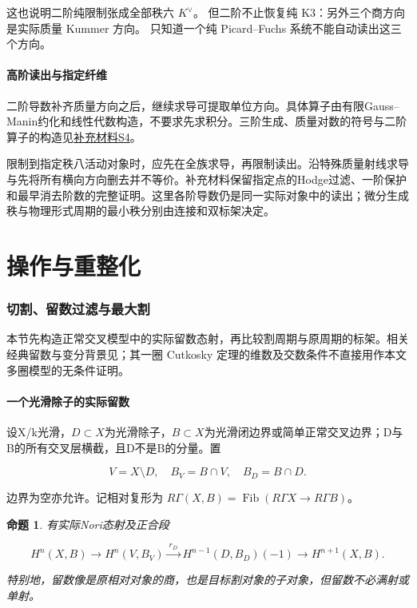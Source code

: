 \documentclass[11pt,a4paper,oneside]{ctexart}
\theoremstyle{cnplain}
\newtheorem{proposition}[theorem]{命题}
\theoremstyle{definition}
\theoremstyle{remark}
\numberwithin{equation}{section}
\newcommand{\otherref}[2]{\href{#1.pdf}{#2}}
\begin{document}
这也说明二阶纯限制张成全部秩六 $K^\vee$。
但二阶不止恢复纯 K3：另外三个商方向是实际质量 Kummer 方向。
只知道一个纯 Picard--Fuchs 系统不能自动读出这三个方向。


\endgroup
\subsection{高阶读出与指定纤维}
二阶导数补齐质量方向之后，继续求导可提取单位方向。具体算子由有限Gauss--Manin约化和线性代数构造，不要求先求积分。三阶生成、质量对数的符号与二阶算子的构造见\otherref{feynman_periods_supplement}{补充材料S4}。

限制到指定秩八活动对象时，应先在全族求导，再限制读出。沿特殊质量射线求导与先将所有横向方向删去并不等价。补充材料保留指定点的Hodge过滤、一阶保护和最早消去阶数的完整证明。这里各阶导数仍是同一实际对象中的读出；微分生成秩与物理形式周期的最小秩分别由连接和双标架决定。

\part{操作与重整化}

\section{切割、留数过滤与最大割}\label{ch:cut}

\begingroup

本节先构造正常交叉模型中的实际留数态射，再比较割周期与原周期的标架。相关经典留数与变分背景见\cite{muhlbauer}；其一圈 Cutkosky 定理的维数及交数条件不直接用作本文多圈模型的无条件证明。

\subsection{一个光滑除子的实际留数}\label{sec:cut:2}

设X/k光滑，\(D\subset X\)为光滑除子，\(B\subset X\)为光滑闭边界或简单正常交叉边界；D与B的所有交叉层横截，且D不是B的分量。置

\begin{equation}
V=X\setminus D,\quad B_V=B\cap V,\quad B_D=B\cap D.
\end{equation}

边界为空亦允许。记相对复形为 \(R\Gamma(X,B)=\operatorname{Fib}(R\Gamma X\to R\Gamma B)\)。

\begin{proposition}

\label{thm:cut:2.1} 有实际Nori态射及正合段

\begin{equation}
H^n(X,B)\longrightarrow H^n(V,B_V)
 \xrightarrow{\ r_D\ }H^{n-1}(D,B_D)(-1)
 \longrightarrow H^{n+1}(X,B).                         \label{eq:cut:2.1}
\end{equation}

特别地，留数像是原相对对象的商，也是目标割对象的子对象，但留数不必满射或单射。

\end{proposition}
\end{document}
